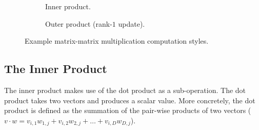 \documentclass[\main/thesis.tex]{subfiles}
\begin{document}
\begin{figure}[t]
 \hfill
  \begin{subfigure}{.45\linewidth}
    \centering
    \caption{Inner product.}
    \label{fig:innerProduct}
  \end{subfigure}
 \hfill
  \begin{subfigure}{.45\linewidth}
    \centering
  \caption{Outer product (rank-$1$ update).}
    \label{fig:outerProduct}
  \end{subfigure}
  \hfill
  \caption{Example matrix-matrix multiplication computation styles.}
  \label{fig:product}
  \vspace{-0.15cm}
\end{figure}

\subsection{The Inner Product}
The inner product makes use of the dot product as a sub-operation.
The dot product takes two vectors and produces a scalar value.
More concretely, the dot product is defined as the summation of the pair-wise products of two vectors (\eg $v \cdot w=v_{i,1}w_{1,j} + v_{i,2}w_{2,j} + \ldots + v_{i,D}w_{D,j}$).
\end{document}
